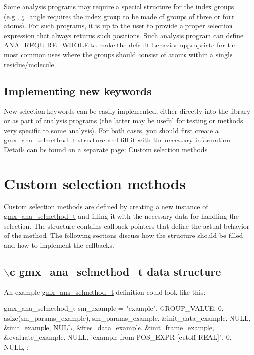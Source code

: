 \-Some analysis programs may require a special structure for the index groups (e.\-g., {\ttfamily g\-\_\-angle} requires the index group to be made of groups of three or four atoms). \-For such programs, it is up to the user to provide a proper selection expression that always returns such positions. \-Such analysis program can define \hyperlink{share_2template_2gromacs_2trajana_8h_a0c15f014b7ee3da0efeb2b279e210633}{\-A\-N\-A\-\_\-\-R\-E\-Q\-U\-I\-R\-E\-\_\-\-W\-H\-O\-L\-E} to make the default behavior appropriate for the most common uses where the groups should consist of atoms within a single residue/molecule.\hypertarget{selengine_selection_methods}{}\subsection{\-Implementing new keywords}\label{selengine_selection_methods}
\-New selection keywords can be easily implemented, either directly into the library or as part of analysis programs (the latter may be useful for testing or methods very specific to some analysis). \-For both cases, you should first create a {\ttfamily \hyperlink{structgmx__ana__selmethod__t}{gmx\-\_\-ana\-\_\-selmethod\-\_\-t}} structure and fill it with the necessary information. \-Details can be found on a separate page\-: \hyperlink{selmethods}{\-Custom selection methods}. \hypertarget{selmethods}{}\section{\-Custom selection methods}\label{selmethods}
\-Custom selection methods are defined by creating a new instance of {\ttfamily \hyperlink{structgmx__ana__selmethod__t}{gmx\-\_\-ana\-\_\-selmethod\-\_\-t}} and filling it with the necessary data for handling the selection. \-The structure contains callback pointers that define the actual behavior of the method. \-The following sections discuss how the structure should be filled and how to implement the callbacks.\hypertarget{selmethods_selmethods_define}{}\subsection{$\backslash$c gmx\-\_\-ana\-\_\-selmethod\-\_\-t data structure}\label{selmethods_selmethods_define}
\-An example {\ttfamily \hyperlink{structgmx__ana__selmethod__t}{gmx\-\_\-ana\-\_\-selmethod\-\_\-t}} definition could look like this\-:


\begin{DoxyCode}
 gmx_ana_selmethod_t sm_example = {
   "example", GROUP_VALUE, 0,
   asize(sm_params_example), sm_params_example,
   &init_data_example,
    NULL,
   &init_example,
    NULL,
   &free_data_example,
   &init_frame_example,
   &evaluate_example,
    NULL,
   {"example from POS_EXPR [cutoff REAL]", 0, NULL},
 };
\end{DoxyCode}


